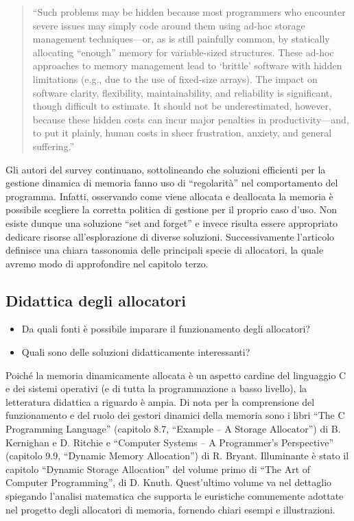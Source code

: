 \begin{quote}
``Such problems may be hidden because most programmers who encounter severe issues may simply code around them using ad-hoc storage management techniques---or, as is still painfully common, by statically allocating ``enough'' memory for variable-sized structures. These ad-hoc approaches to memory management lead to `brittle' software with hidden limitations (e.g., due to the use of fixed-size arrays). The impact on software clarity, flexibility, maintainability, and reliability is significant, though difficult to estimate. It should not be underestimated, however, because these hidden costs can incur major penalties in productivity---and, to put it plainly, human costs in sheer frustration, anxiety, and general suffering.''
\end{quote}

Gli autori del survey continuano, sottolineando che soluzioni efficienti per la gestione dinamica di memoria fanno uso di ``regolarità'' nel comportamento del programma. Infatti, osservando come viene allocata e deallocata la memoria è possibile scegliere la corretta politica di gestione per il proprio caso d’uso. Non esiste dunque una soluzione ``set and forget'' e invece risulta essere appropriato dedicare risorse all’esplorazione di diverse soluzioni. Successivamente l’articolo definisce una chiara tassonomia delle principali specie di allocatori, la quale avremo modo di approfondire nel capitolo terzo.

\subsection{Didattica degli allocatori}

\begin{itemize}
  \item Da quali fonti è possibile imparare il funzionamento degli allocatori?
  \item Quali sono delle soluzioni didatticamente interessanti?
\end{itemize}

Poiché la memoria dinamicamente allocata è un aspetto cardine del linguaggio C e dei sistemi operativi (e di tutta la programmazione a basso livello), la letteratura didattica a riguardo è ampia. Di nota per la comprensione del funzionamento e del ruolo dei gestori dinamici della memoria sono i libri ``The C Programming Language'' (capitolo 8.7, ``Example – A Storage Allocator'') di B. Kernighan e D. Ritchie e ``Computer Systems – A Programmer’s Perspective'' (capitolo 9.9, ``Dynamic Memory Allocation'') di R. Bryant. Illuminante è stato il capitolo ``Dynamic Storage Allocation'' del volume primo di ``The Art of Computer Programming'', di D. Knuth. Quest’ultimo volume va nel dettaglio spiegando l’analisi matematica che supporta le euristiche comunemente adottate nel progetto degli allocatori di memoria, fornendo chiari esempi e illustrazioni.

